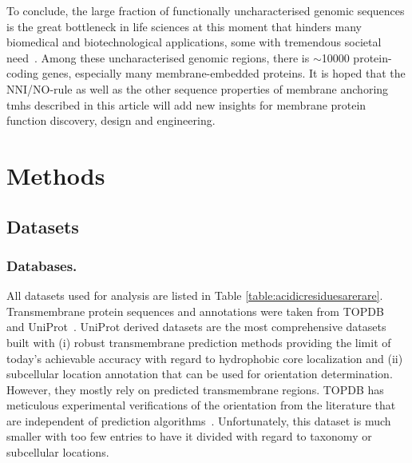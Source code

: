 To conclude, the large fraction of functionally uncharacterised genomic sequences is the great bottleneck in life sciences at this moment that hinders many biomedical and biotechnological applications, some with tremendous societal need~\cite{Eisenhaber2012,Kuznetsov2013}. Among these uncharacterised genomic regions, there is \(\sim\)10000 protein-coding genes, especially many membrane-embedded proteins. It is hoped that the NNI/NO-rule as well as the other sequence properties of membrane anchoring \gls{tmh}s described in this article will add new insights for membrane protein function discovery, design and engineering.

\section{Methods}

\subsection{Datasets}
\subsubsection{Databases.}
All datasets used for analysis are listed in Table \ref{table:acidicresiduesarerare}. Transmembrane protein sequences and annotations were taken from TOPDB~\cite{Dobson2015} and UniProt~\cite{TheUniProtConsortium2014}. UniProt derived datasets are the most comprehensive datasets built with (i) robust transmembrane prediction methods providing the limit of today’s achievable accuracy with regard to hydrophobic core localization and (ii) subcellular location annotation that can be used for orientation determination. However, they mostly rely on predicted transmembrane regions. TOPDB has meticulous experimental verifications of the orientation from the literature that are independent of prediction algorithms~\cite{Dobson2015}. Unfortunately, this dataset is much smaller with too few entries to have it divided with regard to taxonomy or subcellular locations.

